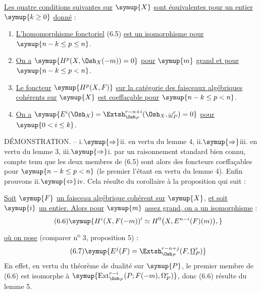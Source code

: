  \uline{Les quatre conditions suivantes sur} $\symup{X}$ \uline{sont
équivalentes pour un entier} $\symup{k\geq0}$ \uline{donné} :
\begin{enumerate}
  \item[\textnormal{i.}] \uline{L'homomorphisme fonctoriel} (6.5) \uline{est un isomorphisme pour}
    $\symup{n-k\leq p\leq n}$.
  \item[\textnormal{ii.}] \uline{On a} $\symup{H^{p}(X,\Osh_X(-m))=0}$ \uline{pour} $\symup{m}$ \uline{grand et pour}
    $\symup{n-k\leq p<n}$.
  \item[\textnormal{iii.}] \uline{Le foncteur} $\symup{H^{p}(X,F)}$ \uline{sur la catégorie des faisceaux
    algébriques cohérents sur} $\symup{X}$ \uline{est coeffaçable pour} $\symup{n-k\leq p<n}$.
  \item[\textnormal{iv.}] \uline{On a}
    $\symup{E^{i}(\Osh_X)=\Extsh_{\Osh_P}^{r-n+i}(\Osh_X,\underline{\omega}_P^{r})=0}$
    \uline{pour} $\symup{0<i\leq k}$.
\end{enumerate}

\noindent DÉMONSTRATION. -- \textnormal{i.}$\symup{\Rightarrow}$\textnormal{ii.} en
vertu du lemme 4, \textnormal{ii.}$\symup{\Rightarrow}$\textnormal{iii.} en vertu du lemme 3,
\textnormal{iii.}$\symup{\Rightarrow}$\textnormal{i.} par un raisonnement standard bien connu,
compte tenu que les deux membres de (6.5) sont alors des foncteurs coeffaçables
pour $\symup{n-k\leq p<n}$ (le premier l'étant en vertu du lemme 4). Enfin prouvons
\textnormal{ii.}$\symup{\Leftrightarrow}$\textnormal{iv.} Cela résulte du corollaire à la
proposition qui suit :

 \uline{Soit} $\symup{F}$ \uline{un faisceau algébrique cohérent sur} $\symup{X}$, \uline{et
soit} $\symup{i}$ \uline{un entier. Alors pour} $\symup{m}$ \uline{assez grand, on a un isomorphisme} :
\begin{equation}\tag{6.6}
  \symup{H^{i}(X,F(-m))'
  \simeq H^{0}\bigl(X,E^{n-i}(F)(m)\bigr),}
\end{equation}
\uline{où on pose} (comparer n\textsuperscript{o} 3, proposition 5) :
\begin{equation}\tag{6.7}
  \symup{E^{j}(F)=\Extsh_{\Osh_P}^{r-n+j}(F,\underline{\Omega}_P^{r})}
\end{equation}
En effet, en vertu du théorème de dualité sur $\symup{P}$, le premier membre de (6.6)
est isomorphe à
$\symup{\operatorname{Ext}_{\Osh_P}^{r-i}(P;F(-m),\Omega_P^{r})}$, donc (6.6) résulte
du lemme 5.

